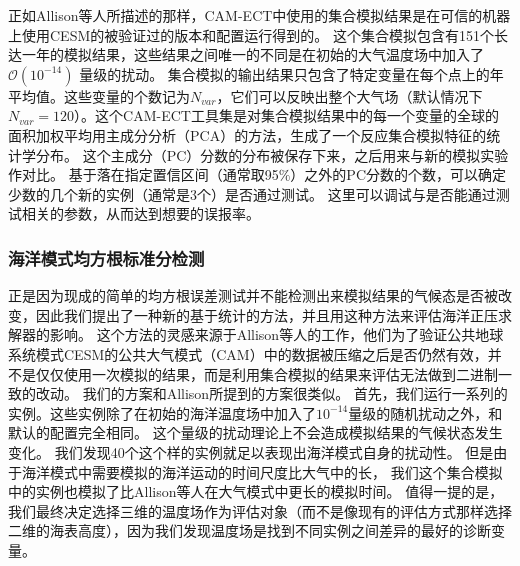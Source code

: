  
正如Allison等人\cite{baker2015}所描述的那样，CAM-ECT中使用的集合模拟结果是在可信的机器上使用CESM的被验证过的版本和配置运行得到的。 
这个集合模拟包含有151个长达一年的模拟结果，这些结果之间唯一的不同是在初始的大气温度场中加入了$\mathcal{O}(10^{-14})$ 量级的扰动。 
集合模拟的输出结果只包含了特定变量在每个点上的年平均值。这些变量的个数记为$N_{var}$，它们可以反映出整个大气场（默认情况下 $N_{var}=120$）。这个CAM-ECT工具集是对集合模拟结果中的每一个变量的全球的面积加权平均用主成分分析（PCA）的方法，生成了一个反应集合模拟特征的统计学分布。
这个主成分（PC）分数的分布被保存下来，之后用来与新的模拟实验作对比。 
基于落在指定置信区间（通常取95$\%$）之外的PC分数的个数，可以确定少数的几个新的实例（通常是3个）是否通过测试。 
这里可以调试与是否能通过测试相关的参数，从而达到想要的误报率。


\subsubsection{海洋模式均方根标准分检测}\label{verify:rmsz}



正是因为现成的简单的均方根误差测试并不能检测出来模拟结果的气候态是否被改变，因此我们提出了一种新的基于统计的方法，并且用这种方法来评估海洋正压求解器的影响。 
这个方法的灵感来源于Allison等人的工作\cite{baker2014methodology}，他们为了验证公共地球系统模式CESM的公共大气模式（CAM）中的数据被压缩之后是否仍然有效，并不是仅仅使用一次模拟的结果，而是利用集合模拟的结果来评估无法做到二进制一致的改动。 
我们的方案和Allison所提到的方案很类似\cite{baker2014methodology}。
首先，我们运行一系列的实例。这些实例除了在初始的海洋温度场中加入了$10^{-14}$量级的随机扰动之外，和默认的配置完全相同。 
这个量级的扰动理论上不会造成模拟结果的气候状态发生变化。 
我们发现40个这个样的实例就足以表现出海洋模式自身的扰动性。
但是由于海洋模式中需要模拟的海洋运动的时间尺度比大气中的长， 我们这个集合模拟中的实例也模拟了比Allison等人在大气模式中更长的模拟时间。 
值得一提的是，我们最终决定选择三维的温度场作为评估对象（而不是像现有的评估方式那样选择二维的海表高度），因为我们发现温度场是找到不同实例之间差异的最好的诊断变量。 
 
